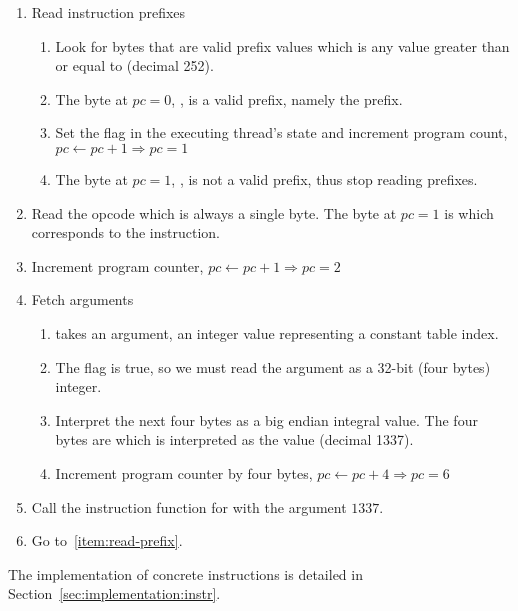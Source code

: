 \begin{enumerate}
\item Read instruction prefixes
  \label{item:read-prefix}
  \begin{enumerate}
  \item Look for bytes that are valid prefix values which is any value greater
    than or equal to  (decimal 252).
  \item The byte at $pc=0$, , is a valid prefix, namely the
     prefix.
  \item Set the  flag in the executing thread's state and
    increment program count, $pc \leftarrow pc + 1 \Rightarrow pc= 1$
  \item The byte at $pc=1$, , is not a valid prefix, thus stop
    reading prefixes.
  \end{enumerate}

\item Read the opcode which is always a single byte. The byte at $pc=1$ is
   which corresponds to the  instruction.

\item Increment program counter, $pc \leftarrow pc + 1 \Rightarrow pc = 2$

\item Fetch arguments
  \begin{enumerate}
  \item {} takes an argument, an integer value representing a
    constant table index.
  \item The  flag is true, so we must read the argument as a
    32-bit (four bytes) integer.
  \item Interpret the next four bytes as a big endian integral value. The four
    bytes are  which is interpreted as the value
     (decimal 1337).
  \item Increment program counter by four bytes,
    $pc \leftarrow pc + 4 \Rightarrow pc = 6$
  \end{enumerate}

\item Call the instruction function for  with the argument
  $1337$.

\item Go to~\ref{item:read-prefix}.

\end{enumerate}

The implementation of concrete instructions is detailed in
Section~\ref{sec:implementation:instr}.

